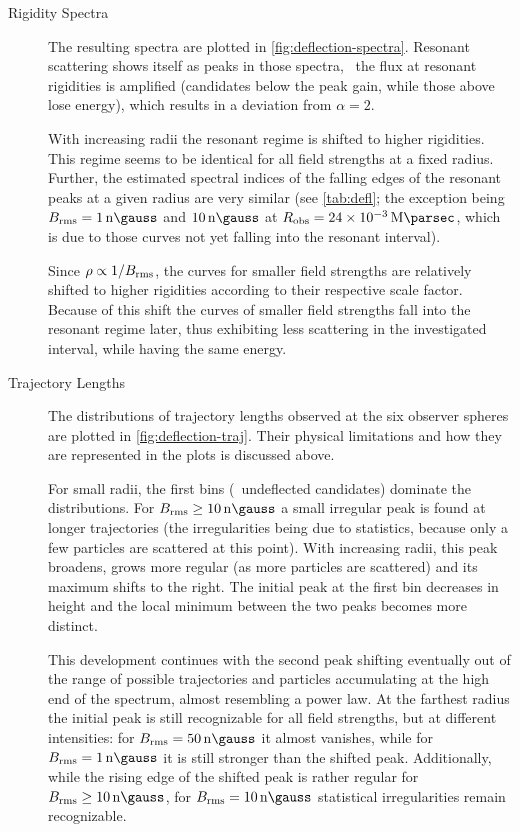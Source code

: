\begin{description}
    \item[Rigidity Spectra]
        The resulting spectra are plotted in \cref{fig:deflection-spectra}.
        Resonant scattering shows itself as peaks in those spectra,
        \ie~the flux at resonant rigidities is amplified (candidates below the
        peak gain, while those above lose energy), which results in a deviation
        from $\alpha=2$.

        With increasing radii the resonant regime is shifted to higher
        rigidities.
        This regime seems to be identical for all field strengths at a fixed
        radius. Further, the estimated spectral indices of the falling edges of
        the resonant peaks at a given radius are very similar (see
        \cref{tab:defl}; the exception being $\Brms=\SI{1}{\nano\gauss}$ and
        $\SI{10}{\nano\gauss}$ at $\Robserver=\SI{24e-3}{\mega\parsec}$, which
        is due to those curves not yet falling into the resonant interval).

        Since $\rho\propto1/B_{\mathrm{rms}}$, the curves for smaller field strengths are
        relatively shifted to higher rigidities according to their respective
        scale factor.
        Because of this shift the curves of smaller field strengths fall into
        the resonant regime later, thus exhibiting less scattering in the
        investigated interval, while having the same energy.

    \item[Trajectory Lengths]
        The distributions of trajectory lengths observed at the six observer
        spheres are plotted in \cref{fig:deflection-traj}.
        Their physical limitations and how they are represented in the plots is
        discussed above.

        For small radii, the first bins (\ie~undeflected candidates) dominate
        the distributions. For $\Brms\ge\SI{10}{\nano\gauss}$ a small irregular
        peak is found at longer trajectories (the irregularities being due to
        statistics, because only a few particles are scattered at this point).
        With increasing radii, this peak broadens, grows more regular (as more
        particles are scattered) and its maximum shifts to the right. The
        initial peak at the first bin decreases in height and the local minimum
        between the two peaks becomes more distinct.

        This development continues with the second peak shifting eventually out
        of the range of possible trajectories and particles accumulating at the
        high end of the spectrum, almost resembling a power law.
        At the farthest radius the initial peak is still recognizable for all
        field strengths, but at different intensities: for
        $\Brms=\SI{50}{\nano\gauss}$ it almost vanishes, while for
        $\Brms=\SI{1}{\nano\gauss}$ it is still stronger than the shifted peak.
        Additionally, while the rising edge of the shifted peak is rather
        regular for $\Brms\ge\SI{10}{\nano\gauss}$, for
        $\Brms=\SI{10}{\nano\gauss}$ statistical irregularities remain
        recognizable.


\end{description}
